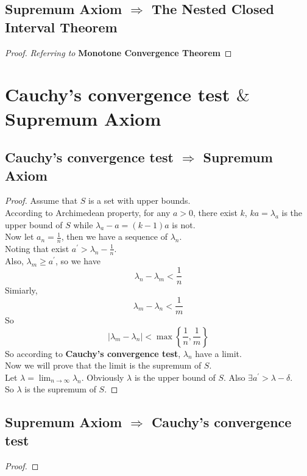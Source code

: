 \documentclass{article}
\begin{document}
\subsection{Supremum Axiom $\Rightarrow$ The Nested Closed Interval Theorem}

\begin{proof}
    \textit{Referring to} 
    \textbf{Monotone Convergence Theorem}
\end{proof}


\section{Cauchy's convergence test $\&$ Supremum Axiom}
\subsection{Cauchy's convergence test $\Rightarrow$ Supremum Axiom}

\begin{proof}
    Assume that $S$ is a set with upper bounds. \\
    According to Archimedean property, for any $a > 0$, there exist $k$, $ka = \lambda_a$ is the upper bound of $S$ while $\lambda_a - a = (k - 1)a$ is not. \\
    Now let $a_n = \frac{1}{n}$, then we have a sequence of ${\lambda_n}$. \\
    Noting that exist $a^{\prime} > \lambda_n - \frac{1}{n}$. \\
    Also, $\lambda_m \geqslant a^{\prime}$, so we have
    $$\lambda_n - \lambda_m < \frac{1}{n}$$
    Simiarly, 
    $$\lambda_m - \lambda_n < \frac{1}{m}$$
    So
    $$\left\lvert \lambda_m - \lambda_n \right\rvert < \max\left\{\frac{1}{n}, \frac{1}{m}\right\}$$
    So according to \textbf{Cauchy's convergence test}, ${\lambda_n}$ have a limit. \\
    Now we will prove that the limit is the supremum of $S$. \\
    Let $\displaystyle{\lambda = \lim_{n \to \infty }\lambda_n}$.
    Obviously $\lambda$ is the upper bound of $S$. Also $\exists a^{\prime} > \lambda - \delta$. \\
    So $\lambda$ is the supremum of $S$.\qedhere 
\end{proof}

\subsection{Supremum Axiom $\Rightarrow$ Cauchy's convergence test}

\begin{proof}
    
\end{proof}
\end{document}
